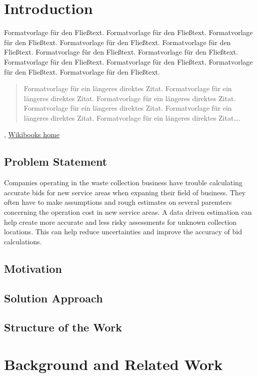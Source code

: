 \documentclass[a4paper,12pt,twoside]{scrreprt}
\begin{document}
\chapter{Introduction}
Formatvorlage für den Fließtext. Formatvorlage für den Fließtext. Formatvorlage für den Fließtext. Formatvorlage für den Fließtext. Formatvorlage für den Fließtext. Formatvorlage für den Fließtext. Formatvorlage für den Fließtext. Formatvorlage für den Fließtext. Formatvorlage für den Fließtext. Formatvorlage für den Fließtext. Formatvorlage für den Fließtext. 
\begin{quote}
  Formatvorlage für ein längeres direktes Zitat. Formatvorlage für ein längeres direktes Zitat. Formatvorlage für ein längeres direktes Zitat. Formatvorlage für ein längeres direktes Zitat. Formatvorlage für ein längeres direktes Zitat. Formatvorlage für ein längeres direktes Zitat….
\end{quote}

, \href{https://www.wikibooks.org}{Wikibooks home}

\section{Problem Statement}

Companies operating in the waste collection business have trouble calculating accurate bids for new service areas when expaning their field of business. They often have to make assumptions and rough estimates on several paremters concerning the operation cost in new service areas. A data driven estimation can help create more accurate and less risky assessments for unknown collection locations. This can help reduce uncertainties and improve the accuracy of bid calculations. 
\section{Motivation}

\section{Solution Approach}

\section{Structure of the Work}


\chapter{Background and Related Work}
\end{document}
